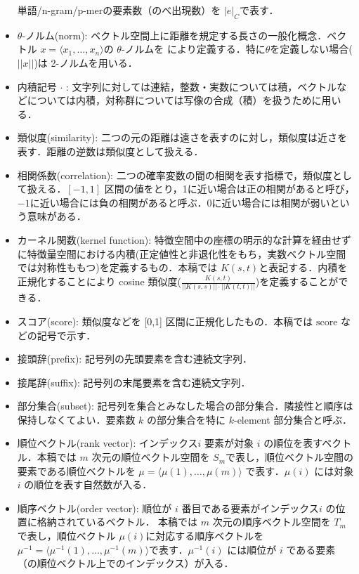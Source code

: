\documentclass[japanese]{jnlp_1.4}
\newcommand{\modified}[1]{}
\begin{document}
\begin{itemize}
      単語/n-gram/p-merの要素数（のべ出現数）を $|e|_{C}$で表す．
\item $\theta$-ノルム(norm): ベクトル空間上に距離を規定する長さの一般化概念．ベクトル $x=\langle x_{1}, \ldots, x_{n} \rangle$の $\theta$-ノルムを \modified{$||x||_{\theta} = (\sum^{n}_{i=1} |x_{i}|^{\theta})^{1/\theta}$ }により定義する．特に$\theta$を定義しない場合($||x||$)は 2-ノルムを用いる．
\item 内積記号 $\cdot$ : 文字列に対しては連結，整数・実数については積，ベクトルなどについては内積，対称群については写像の合成（積）を扱うために用いる．
\item 類似度(similarity): 二つの元の距離は遠さを表すのに対し，類似度は近さを表す．距離の逆数は類似度として扱える．
\item 相関係数(correlation): 二つの確率変数の間の相関を表す指標で，類似度として扱える．$[-1,1]$ 区間の値をとり，1に近い場合は正の相関があると呼び，$-1$に近い場合には負の相関があると呼ぶ．0に近い場合には相関が弱いという意味がある．
\item カーネル関数(kernel function):  特徴空間中の座標の明示的な計算を経由せずに特徴量空間における内積(正定値性と非退化性をもち，実数ベクトル空間では対称性ももつ)を定義するもの．本稿では $K(s,t)$と表記する．内積を正規化することにより cosine 類似度($\frac{K(s,t)}{||K(s,s)||\cdot||K(t,t)||}$)を定義することができる．
\item スコア(score): 類似度などを [0,1] 区間に正規化したもの．本稿では $\mbox{score}$ などの記号で示す．
\item 接頭辞(prefix): 記号列の先頭要素を含む連続文字列．
\item 接尾辞(suffix): 記号列の末尾要素を含む連続文字列．
\item 部分集合(subset): 記号列を集合とみなした場合の部分集合．隣接性と順序は保持しなくてよい．要素数 $k$ の部分集合を特に $k$-element 部分集合と呼ぶ．
\item 順位ベクトル(rank vector): インデックス$i$ 要素が対象 $i$ の順位を表すベクトル．本稿では $m$ 次元の順位ベクトル空間を $S_{m}$で表し，順位ベクトル空間の要素である順位ベクトルを $\mu= \langle \mu(1), \ldots, \mu(m) \rangle$ で表す．$\mu(i)$ には対象 $i$ の順位を表す自然数が入る．
\item 順序ベクトル(order vector): 順位が $i$ 番目である要素がインデックス$i$ の位置に格納されているベクトル．
  本稿では $m$ 次元の順序ベクトル空間を $T_{m}$で表し，順位ベクトル $\mu(i)$に対応する順序ベクトルを $\mu^{-1} = \langle \mu^{-1}(1), \ldots, \mu^{-1}(m) \rangle$で表す．$\mu^{-1}(i)$ には順位が $i$ である要素（の順位ベクトル上でのインデックス）が入る．

\end{itemize}
\end{document}
